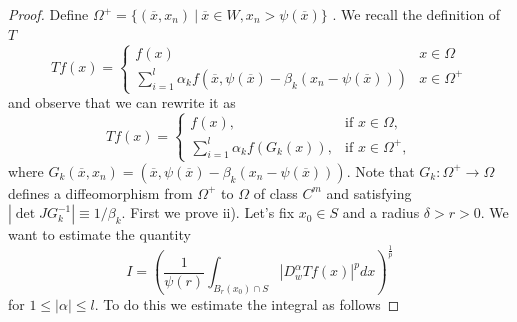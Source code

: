 \documentclass[12pt]{article}
\theoremstyle{definition}
\begin{document}
\begin{proof}
Define $\Omega^+ =\{ (\overline x,x_n) \ |\ \overline x\in W, x_n> \psi(\overline x)  \}$ . We recall the definition of $T$
\[ Tf(x) = \begin{cases}
		f(x) & x \in \Omega \\
		\sum_{i=1}^l \alpha_k f(\overline x, \psi(\overline x)- \beta_k(x_n-\psi(\overline x))) & x \in \Omega^+
\end{cases} 
\]
and observe that we can rewrite it as
\[ Tf(x) = \begin{cases}
		f(x), & \text{if }x \in \Omega, \\
		\sum_{i=1}^l \alpha_k f(G_k(x)), & \text{if } x \in \Omega^+,
\end{cases} 
\]
where $G_k(\overline x, x_n)=(\overline x, \psi(\overline x)- \beta_k(x_n-\psi(\overline x)))$. Note that $G_k: \Omega^+\rightarrow \Omega$ defines a diffeomorphism from $\Omega^+$ to $\Omega$ of class $C^m$ and satisfying $|\det JG_k^{-1}|\equiv 1/\beta_k.$ First we prove ii). Let's fix $x_0 \in S$ and a radius $\delta>r>0$. We want to estimate the quantity 
\[ I=\left ( \frac{1}{\psi(r)} \int_{B_r(x_0)\cap S} |D^\alpha_w Tf(x)|^pdx \right)^{\frac{1}{p}}\]
for $1\le|\alpha| \le l$. To do this we estimate the integral as follows


\end{proof}
\end{document}
